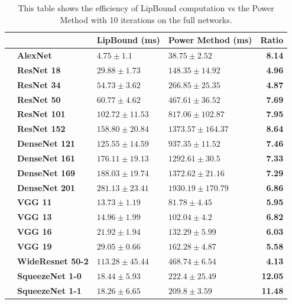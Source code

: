 \begin{table}[htb]
  \centering
  \caption{This table shows the efficiency of LipBound computation vs the Power Method with 10 iterations on the full networks.}
  {\footnotesize
    \begin{tabular}{llllr}
    \toprule
      &   & \multicolumn{1}{c}{\textbf{LipBound (ms)}} & \multicolumn{1}{c}{\textbf{Power Method (ms)}} & \textbf{Ratio} \\
    \midrule
     \cite{krizhevsky2012imagenet} & \textbf{AlexNet} & \phantom{....}$4.75\pm1.1$ & \phantom{....}$38.75\pm2.52$ & \textbf{8.14 }\\
    \midrule
    \multirow{5}[2]{*}{\cite{he2016deep}} & \textbf{ResNet 18} & \phantom{..}$29.88\pm1.73$ & \phantom{..}$148.35\pm14.92$ & \textbf{4.96 }\\
      & \textbf{ResNet 34} & \phantom{..}$54.73\pm3.62$ & \phantom{..}$266.85\pm25.35$ & \textbf{4.87 }\\
      & \textbf{ResNet 50} & \phantom{..}$60.77\pm4.62$ & \phantom{..}$467.61\pm36.52$ & \textbf{7.69 }\\
      & \textbf{ResNet 101} & $102.72\pm11.53$ & \phantom{..}$817.06\pm102.87$ & \textbf{7.95 }\\
      & \textbf{ResNet 152} & $158.80\pm20.84$ & $1373.57\pm164.37$ & \textbf{8.64} \\
    \midrule
    \multirow{4}[2]{*}{\cite{huang2017densely}} & \textbf{DenseNet 121} & $125.55\pm14.59$ & \phantom{..}$937.35\pm11.52$ & \textbf{7.46 }\\
      & \textbf{DenseNet 161} & $176.11\pm19.13$ & $1292.61\pm30.5$ & \textbf{7.33} \\
      & \textbf{DenseNet 169} & $188.03\pm19.74$ & $1372.62\pm21.16$ & \textbf{7.29} \\
      & \textbf{DenseNet 201} & $281.13\pm23.41$ & $1930.19\pm170.79$ & \textbf{6.86 }\\
    \midrule
    \multirow{4}[2]{*}{\cite{simonyan2014very}} & \textbf{VGG 11} & \phantom{..}$13.73\pm1.19$ & \phantom{....}$81.78\pm4.45$ & \textbf{5.95 }\\
      & \textbf{VGG 13} & \phantom{..}$14.96\pm1.99$ & \phantom{..}$102.04\pm4.2$ & \textbf{6.82 }\\
      & \textbf{VGG 16} & \phantom{..}$21.92\pm1.94$ & \phantom{..}$132.29\pm5.99$ & \textbf{6.03 }\\
      & \textbf{VGG 19} & \phantom{..}$29.05\pm0.66$ & \phantom{..}$162.28\pm4.87$ & \textbf{5.58 }\\
    \midrule
    \cite{zagoruyko2016wide} & \textbf{WideResnet 50-2} & $113.28\pm45.44$ & \phantom{..}$468.74\pm6.54$ & \textbf{4.13 }\\
    \midrule
    \multirow{2}[2]{*}{\cite{iandola2016squeezenet}} & \textbf{SqueezeNet 1-0} & \phantom{..}$18.44\pm5.93$ & \phantom{....}$222.4\pm25.49$ & \textbf{12.05} \\
      & \textbf{SqueezeNet 1-1} & \phantom{..}$18.26\pm6.65$ & \phantom{....}$209.8\pm3.59$ & \textbf{11.48} \\
    \bottomrule
    \end{tabular}%
    }
  \label{tab:efficiency_lipbound_full_model}%
\end{table}%

